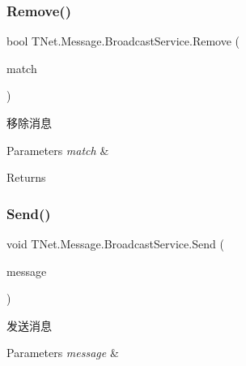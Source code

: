 \subsubsection{\texorpdfstring{Remove()}{Remove()}\hspace{0.1cm}{\footnotesize\ttfamily [2/2]}}
{\footnotesize\ttfamily bool T\+Net.\+Message.\+Broadcast\+Service.\+Remove (\begin{DoxyParamCaption}\item[{Predicate$<$ \mbox{\hyperlink{class_t_net_1_1_message_1_1_notice_message}{Notice\+Message}} $>$}]{match }\end{DoxyParamCaption})}



移除消息 


\begin{DoxyParams}{Parameters}
{\em match} & \\
\hline
\end{DoxyParams}
\begin{DoxyReturn}{Returns}

\end{DoxyReturn}
\mbox{\label{class_t_net_1_1_message_1_1_broadcast_service_a5ad42f9251c0a03422fce8141221c7f0}} 
\subsubsection{\texorpdfstring{Send()}{Send()}}
{\footnotesize\ttfamily void T\+Net.\+Message.\+Broadcast\+Service.\+Send (\begin{DoxyParamCaption}\item[{\mbox{\hyperlink{class_t_net_1_1_message_1_1_notice_message}{Notice\+Message}}}]{message }\end{DoxyParamCaption})}



发送消息 


\begin{DoxyParams}{Parameters}
{\em message} & \\
\hline
\end{DoxyParams}
\mbox{\label{class_t_net_1_1_message_1_1_broadcast_service_a20899b271214c545784a3d1481f3965a}} 
